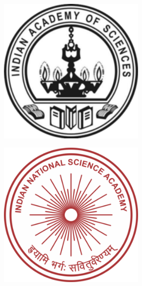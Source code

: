 \documentclass[12pt,a4paper,twoside]{report}
\begin{document}
\begin{titlepage}
		\begin{figure}[htb]
			\centering
			\begin{subfigure}[h]{0.3\textwidth}
				\centering
				\includegraphics[width=0.8\textwidth]{ias.png}
			\end{subfigure}%
			\begin{subfigure}[h]{0.3\textwidth}
				\centering
				\includegraphics[width=0.8\textwidth]{insa.png}
			\end{subfigure}%
			\begin{subfigure}[h]{0.3\textwidth}

\end{subfigure}
\end{figure}
\end{titlepage}
\end{document}
